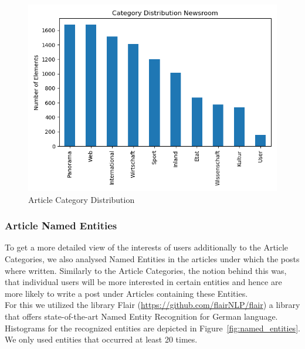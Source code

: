 \documentclass[acmsmall]{acmart}
\begin{document}
\begin{figure}[H]
\includegraphics[width=.5\linewidth]{assets/Category_Distribution_Newsroom.png}
\caption{Article Category Distribution}
\label{fig:article_categories}
\end{figure}


\subsubsection{Article Named Entities}
To get a more detailed view of the interests of users additionally to the Article Categories, we also analysed Named Entities in the articles under which the posts where written. Similarly to the Article Categories, the notion behind this was, that individual users will be more interested in certain entities and hence are more likely to write a post under Articles containing these Entities. \\
For this we utilized the library Flair (\url{https://github.com/flairNLP/flair}) a library that offers state-of-the-art Named Entity Recognition for German language. Histograms for the recognized entities are depicted in Figure~\ref{fig:named_entities}. We only used entities that occurred at least 20 times. 
\end{document}
